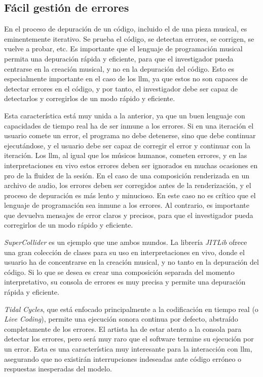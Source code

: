 \subsection{Fácil gestión de errores}
En el proceso de depuración de un código, incluido el de una pieza musical, es eminentemente iterativo. Se prueba el código, se detectan errores, se corrigen, se vuelve a probar, etc. Es importante que el lenguaje de programación musical permita una depuración rápida y eficiente, para que el investigador pueda centrarse en la creación musical, y no en la depuración del código. Esto es especialmente importante en el caso de los \gls{llm}, ya que estos no son capaces de detectar errores en el código, y por tanto, el investigador debe ser capaz de detectarlos y corregirlos de un modo rápido y eficiente.

Esta característica está muy unida a la anterior, ya que un buen lenguaje con capacidades de tiempo real ha de ser inmune a los errores. Si en una iteración el usuario comete un error, el programa no debe detenerse, sino que debe continuar ejecutándose, y el usuario debe ser capaz de corregir el error y continuar con la iteración. Los \gls{llm}, al igual que los músicos humanos, cometen errores, y en las interpretaciones en vivo estos errores deben ser ignorados en muchas ocasiones en pro de la fluidez de la sesión. En el caso de una composición renderizada en un archivo de audio, los errores deben ser corregidos antes de la renderización, y el proceso de depuración es más lento y minucioso. En este caso no es crítico que el lenguaje de programación sea inmune a los errores. Al contrario, es importante que devuelva mensajes de error claros y precisos, para que el investigador pueda corregirlos de un modo rápido y eficiente. 

\emph{SuperCollider} es un ejemplo que une ambos mundos. La librería \emph{JITLib} ofrece una gran colección de clases para su uso en interpretaciones en vivo, donde el usuario ha de concentrarse en la creación musical, y no tanto en la depuración del código. Si lo que se desea es crear una composición separada del momento interpretativo, su consola de errores es muy precisa y permite una depuración rápida y eficiente.

\emph{Tidal Cycles}, que está enfocado principalmente a la codificación en tiempo real (o \emph{Live Coding}), permite una ejecución sonora continua por defecto, abstraído completamente de los errores. El artista ha de estar atento a la consola para detectar los errores, pero será muy raro que el software termine su ejecución por un error. Esta es una característica muy interesante para la interacción con \gls{llm}, asegurando que no existirán interrupciones indeseadas ante código erróneo o respuestas inesperadas del modelo.

